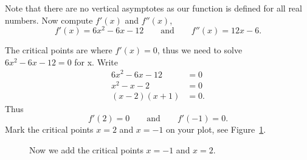 Note that there are no vertical asymptotes as our function is defined
for all real numbers.  Now compute $f'(x)$ and $f''(x)$,
\[
f'(x) = 6x^2 -6x -12\qquad\text{and}\qquad f''(x) = 12x-6.
\]

The critical points are where $f'(x) = 0$, thus we need to solve $6x^2
-6x -12 = 0$ for x. Write
\begin{align*}
6x^2 -6x -12 &= 0 \\
x^2 - x -2 &=0\\
(x-2)(x+1) &=0.
\end{align*}
Thus
\[
f'(2) = 0\qquad\text{and}\qquad f'(-1) = 0.
\]
Mark the critical points $x=2$ and $x=-1$ on your plot, see
Figure~\ref{figure:CS2}. \cite{mooc}
\begin{figure}[H]
    \centering
{}
\caption{Now we add the critical points $x=-1$ and $x=2$. \cite{mooc}}
\label{figure:CS2}
\end{figure}

